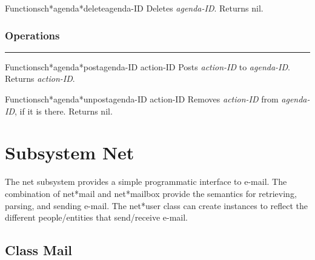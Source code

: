 \begin{functiondoc}{Function}{sch*agenda*delete}{agenda-ID}
Deletes {\em agenda-ID}.  Returns nil.
\end{functiondoc}


\subsubsection*{Operations}
\par\vspace*{0.00in}\par\hrule\par\medskip\par


\begin{functiondoc}{Function}{sch*agenda*post}{agenda-ID action-ID}
Posts {\em action-ID} to {\em agenda-ID}.
Returns {\em action-ID}.
\end{functiondoc}

\begin{functiondoc}{Function}{sch*agenda*unpost}{agenda-ID action-ID}
Removes {\em action-ID} from {\em agenda-ID}, if it is there.
Returns nil.
\end{functiondoc}


\section{Subsystem Net}


The net subsystem provides a simple programmatic interface to e-mail.  The
combination of net*mail and net*mailbox provide the semantics for
retrieving, parsing, and sending e-mail.  The net*user class can create
instances to reflect the different people/entities that send/receive e-mail.

\clearpage

\subsection{Class Mail}

